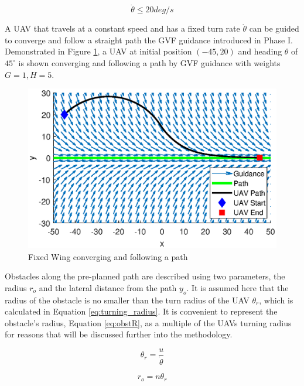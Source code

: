 \documentclass[numbered,pdftex]{ohio-etd}
\begin{document}
\begin{equation}
\label{turnRate}
\dot{\theta} \leq 20 deg/s
\end{equation}



A UAV that travels at a constant speed and has a fixed turn rate $\dot{\theta}$ can be guided to converge and follow a straight path the GVF guidance introduced in Phase I. Demonstrated in Figure \ref{fig:uavPathFollowDemo}, a UAV at initial position $(-45,20)$ and heading $\theta$ of $45^\circ$ is shown converging and following a path by GVF guidance with weights $G=1,H=5$.


\begin{figure}[H]
	\centering
	\includegraphics[trim=0 25 0 45,clip,width=14cm]{PaperFigures/Methods/uavPathFollowDemo}
	\caption{Fixed Wing converging and following a path}
	\label{fig:uavPathFollowDemo}
\end{figure}




Obstacles along the pre-planned path are described using two parameters, the radius $r_o$ and the lateral distance from the path $y_o$. It is assumed here that the radius of the obstacle is no smaller than the turn radius of the UAV $\theta_r$, which is calculated in Equation \ref{eq:turning_radius}. It is convenient to represent the obstacle's radius, Equation \ref{eq:obstR}, as a multiple of the UAVs turning radius for reasons that will be discussed further into the methodology.


\begin{equation}
\label{eq:turning_radius}
\theta_r = \frac{u}{\dot{\theta}}
\end{equation}

\begin{equation}
\label{eq:obstR}
r_o = n \theta_r
\end{equation}
\end{document}
